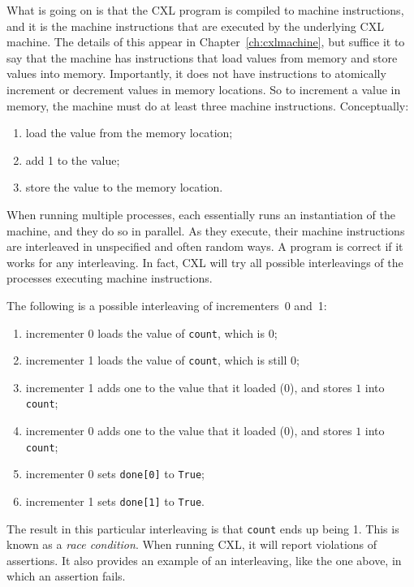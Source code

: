 \documentclass{report}
\begin{document}
What is going on is that the CXL program is compiled to machine instructions,
and it is the machine instructions that are executed by the underlying CXL
machine.  The details of this appear in Chapter~\ref{ch:cxlmachine},
but suffice it to
say that the machine has instructions that load values from memory and store
values into memory.  Importantly, it does not have instructions to atomically
increment or decrement values in memory locations.
So to increment a value in memory,
the machine must do at least three machine instructions.  Conceptually:
\begin{enumerate}
\item load the value from the memory location;
\item add 1 to the value;
\item store the value to the memory location.
\end{enumerate}

When running multiple processes, each essentially runs an instantiation of
the machine, and they do so in parallel.  As they execute, their machine
instructions are interleaved
in unspecified and often random ways.
A program is correct if it works for any interleaving.
In fact, CXL will try all possible interleavings of the processes
executing machine instructions.

The following is a possible interleaving of incrementers~0 and~1:
\begin{enumerate}
\item incrementer 0 loads the value of \texttt{count}, which is 0;
\item incrementer 1 loads the value of \texttt{count}, which is still 0;
\item incrementer 1 adds one to the value that it loaded (0), and
stores $1$ into \texttt{count};
\item incrementer 0 adds one to the value that it loaded (0), and
stores $1$ into \texttt{count};
\item incrementer 0 sets \texttt{done[0]} to \texttt{True};
\item incrementer 1 sets \texttt{done[1]} to \texttt{True}.
\end{enumerate}

The result in this particular interleaving is that \texttt{count} ends up
being 1.
This is known as a \emph{race condition}.
When running CXL, it will
report violations of assertions.  It also provides an example
of an interleaving, like the one above, in which an assertion fails.
\end{document}
